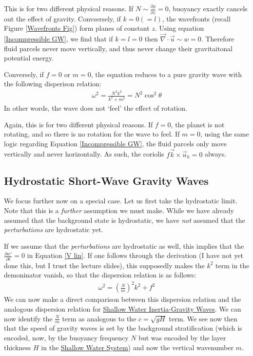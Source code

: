 This is for two different physical reasons. If \(N\sim\frac{\partial \rho}{\partial z}=0\), buoyancy exactly cancels out the effect of gravity. Convsersely, if \(k=0 (=l)\), the wavefronts (recall Figure \ref{Wavefronts Fig}) form planes of constant \(z\). Using equation \ref{Incompressible GW}, we find that if \(k=l=0\) then \(\vec{\nabla}\cdot\vec{u}\sim w = 0\). Therefore fluid parcels never move vertically, and thus never change their gravitaitonal potential energy.

Conversely, if \(f=0\) or \(m=0\), the equation reduces to a pure gravity wave with the following disperison relation:
\begin{align*}
    \omega^2 = \frac{N^2 k^2}{k^2 + m^2} = N^2\cos^2 \theta 
\end{align*}
In other words, the wave does not `feel' the effect of rotation.

Again, this is for two different physical reasons. If \(f=0\), the planet is not rotating, and so there is no rotation for the wave to feel. If \(m=0\), using the same logic regarding Equation \ref{Incompressible GW}, the fluid parcels only move vertically and never horizontally. As such, the coriolis \(f\vec{k}\times\vec{u}_h=0\) always.

\subsection{Hydrostatic Short-Wave Gravity Waves}

We focus further now on a special case. Let us first take the hydrostatic limit. Note that this is a \textit{further} assumption we must make. While we have already assumed that the background state is hydrostatic, we have \textit{not} assumed that the \textit{perturbations} are hydrostatic yet. 

If we assume that the \textit{perturbations} are hydrostatic as well, this implies that the \(\frac{\partial w'}{\partial t}=0\) in Equation \ref{V lin}. If one follows through the derivation (I have not yet done this, but I trust the lecture slides), this supposedly makes the \(k^2\) term in the demoninator vanish, so that the dispersion relation is as follows:
\begin{align*}
    \omega^2=\left( \frac{N}{m} \right)^2 k^2 + f^2
\end{align*}
We can now make a direct comparison between this dispersion relation and the analogous dispersion relation for \hyperref[IG SW Box]{Shallow Water Inertia-Gravity Waves}. We can now identify the \(\frac{N}{m}\) term as analogous to the \(c=\sqrt{gH}\) term. We see now then that the speed of gravity waves is set by the background stratification (which is encoded, now, by the buoyancy frequency \(N\) but was encoded by the layer thickness \(H\) in the \hyperref[Shallow Water System]{Shallow Water System}) and now the vertical wavenumber \(m\).

